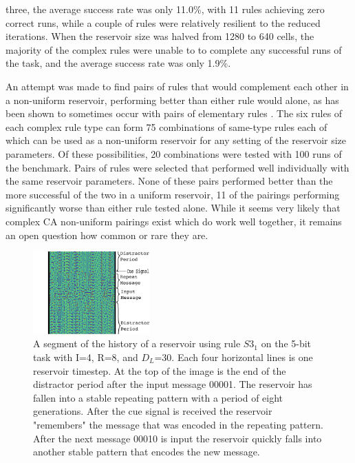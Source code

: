 \documentclass{elsarticle}
\begin{document}
\begin{multicols}{2}
three, the average success rate was only 11.0\%, with 11 rules achieving zero 
correct runs, while a  couple of rules were  relatively resilient to the 
reduced iterations. When the reservoir size was halved from 1280 to 640  cells, 
        the majority of the complex rules were unable to to complete any 
            successful runs of the task, and the average success rate was only 
            1.9\%. \par An attempt was made to find pairs of rules that would 
            complement each other in a non-uniform reservoir, performing better 
            than either rule would alone, as has been shown to sometimes occur 
            with pairs of elementary rules \cite{nichele2017reservoir}. The six 
            rules of each complex rule type can form 75 combinations of 
            same-type rules each of which can be used as a non-uniform 
            reservoir for  any setting of the reservoir size parameters. Of 
            these possibilities, 20 combinations were tested with 100 runs of 
            the benchmark. Pairs of rules were selected that performed well 
            individually with the same reservoir parameters.  None of these 
            pairs performed better than the more successful of the two in a 
            uniform reservoir, 11 of the pairings performing significantly 
            worse than either rule tested alone. While it seems very likely 
            that complex CA non-uniform pairings exist which do work well 
            together, it remains an open question how common or rare they are.
 

\begin{figure}[H]
\centering
\includegraphics[width=0.4\textwidth]{RepeatMessage.png}
\caption{A segment of the history of a reservoir using rule $S3_{1}$ on the 
   5-bit task with I=4, R=8, and $D_{L}$=30. Each four horizontal lines is one 
      reservoir timestep. At the top of the image is the end of the distractor 
      period after the input message 00001. The reservoir has fallen into a 
      stable repeating pattern with a period of eight generations. After the 
      cue signal is received the reservoir "remembers" the message that was 
      encoded in the repeating pattern. After the next message 00010 is input 
      the reservoir quickly falls into another stable pattern that encodes the 
      new message.} 
        

\end{figure}
\end{multicols}
\end{document}
